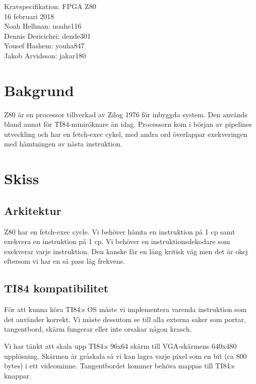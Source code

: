\documentclass[12pt]{article}
\date{\today}
\begin{document}
\begin{center}
\vspace*{2cm}
{\Huge Kravspecifikation: FPGA Z80}\\
\vspace{2cm}
{\large 16 februari 2018}\\
\vspace{2cm}
Noah Hellman: noahe116 \\
Dennis Dericichei: dende301 \\
Yousef Hashem: youha847 \\
Jakob Arvidsson: jakar180 \\
\end{center}

\newpage

\section{Bakgrund}
Z80 är en processor tillverkad av Zilog 1976 för inbyggda system. Den används
bland annat för TI84-miniröknare än idag. Processorn kom i början av pipelines
utveckling och har en fetch-exec cykel, med andra ord överlappar exekveringen
med hämtningen av nästa instruktion.

\section{Skiss}
\subsection{Arkitektur}
Z80 har en fetch-exec cycle. Vi behöver  hämta en instruktion på  1 cp samt
exekvera en instruktion på 1 cp. Vi behöver en instruktionsdekodare som
exekverar varje instruktion. Den kanske får en lång kritisk väg men det är okej
eftersom vi har en så pass låg frekvens. 

\subsection{TI84 kompatibilitet}
För att kunna köra TI84:s OS måste vi implementera varenda instruktion som
det använder korrekt. Vi måste dessutom  se till alla externa saker som
portar, tangentbord, skärm fungerar eller inte orsakar någon krasch.

Vi har tänkt att skala upp TI84:s 96x64 skärm till VGA-skärmens 640x480
upplösning. Skärmen är gråskala så vi kan lagra varje pixel som en bit (ca 800
bytes) i ett videominne. Tangentbordet kommer behöva mappas till TI84:s
knappar.
\end{document}
